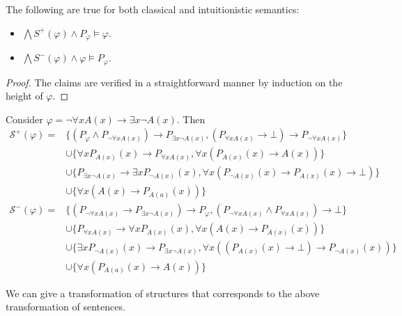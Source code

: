 \documentclass[a4paper,UKenglish,cleveref, autoref, thm-restate]{lipics-v2021}
\begin{document}
\begin{lemma}The following are true for both classical and intuitionistic semantics:
	\begin{itemize}
		\item $\bigwedge S^+(\varphi)\wedge P_\varphi\models\varphi$. 
		\item $\bigwedge S^-(\varphi)\wedge \varphi\models P_\varphi$. 
	\end{itemize}
\end{lemma}

\begin{proof}
	The claims are verified in a straightforward manner by induction on the height of $\varphi$.
\end{proof}

\begin{example}
	Consider $\varphi = \neg\forall x A(x)\to \exists x\neg A(x)$. Then
	\begin{align*}
		\mathcal S^+(\varphi) = &\{(P_\varphi\wedge P_{\neg\forall x A(x)})\to P_{\exists x\neg A(x)}, (P_{\forall xA(x)}\to\bot)\to P_{\neg \forall xA(x)}\}\\&\cup\{\forall xP_{A(x)}(x)\to P_{\forall xA(x)}, \forall x(P_{A(x)}(x)\to A(x))\}\\&\cup\{P_{\exists x\neg A(x)}\to \exists xP_{\neg A(x)}(x), \forall x(P_{\neg A(x)}(x)\to P_{A(x)}(x)\to \bot)\}\\&\cup\{\forall x(A(x)\to P_{A(a)}(x))\}\\
		\mathcal S^-(\varphi) = &\{(P_{\neg\forall x A(x)}\to P_{\exists x\neg A(x)})\to P_\varphi,  (P_{\neg \forall xA(x)}\wedge P_{\forall xA(x)})\to\bot\}\\&\cup\{P_{\forall xA(x)}\to \forall xP_{A(x)}(x), \forall x(A(x)\to P_{A(x)}(x))\}\\&\cup\{\exists xP_{\neg A(x)}(x)\to P_{\exists x\neg A(x)}, \forall x((P_{A(x)}(x)\to \bot)\to P_{\neg A(x)}(x))\}\\&\cup\{\forall x(P_{A(a)}(x)\to A(x))\}
	\end{align*}
\end{example}

We can give a transformation of structures that corresponds to the above transformation of sentences.	
\end{document}
